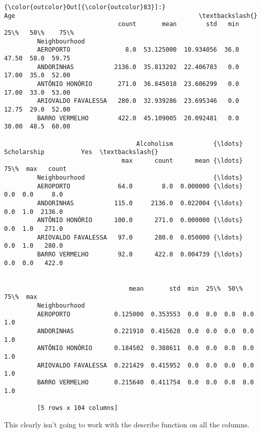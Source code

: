 \documentclass[11pt]{article}
\begin{document}
\begin{Verbatim}[commandchars=\\\{\}]
{\color{outcolor}Out[{\color{outcolor}83}]:}                         Age                                                  \textbackslash{}
                               count       mean        std   min    25\%   50\%    75\%   
         Neighbourhood                                                                 
         AEROPORTO               8.0  53.125000  10.934056  36.0  47.50  58.0  59.75   
         ANDORINHAS           2136.0  35.813202  22.406783   0.0  17.00  35.0  52.00   
         ANTÔNIO HONÓRIO       271.0  36.845018  23.606299   0.0  17.00  33.0  53.00   
         ARIOVALDO FAVALESSA   280.0  32.939286  23.695346   0.0  12.75  29.0  52.00   
         BARRO VERMELHO        422.0  45.109005  20.092481   0.0  30.00  48.5  60.00   
         
                                    Alcoholism           {\ldots}  Scholarship          Yes  \textbackslash{}
                                max      count      mean {\ldots}          75\%  max   count   
         Neighbourhood                                   {\ldots}                             
         AEROPORTO             64.0        8.0  0.000000 {\ldots}          0.0  0.0     8.0   
         ANDORINHAS           115.0     2136.0  0.022004 {\ldots}          0.0  1.0  2136.0   
         ANTÔNIO HONÓRIO      100.0      271.0  0.000000 {\ldots}          0.0  1.0   271.0   
         ARIOVALDO FAVALESSA   97.0      280.0  0.050000 {\ldots}          0.0  1.0   280.0   
         BARRO VERMELHO        92.0      422.0  0.004739 {\ldots}          0.0  0.0   422.0   
         
                                                                           
                                  mean       std  min  25\%  50\%  75\%  max  
         Neighbourhood                                                     
         AEROPORTO            0.125000  0.353553  0.0  0.0  0.0  0.0  1.0  
         ANDORINHAS           0.221910  0.415628  0.0  0.0  0.0  0.0  1.0  
         ANTÔNIO HONÓRIO      0.184502  0.388611  0.0  0.0  0.0  0.0  1.0  
         ARIOVALDO FAVALESSA  0.221429  0.415952  0.0  0.0  0.0  0.0  1.0  
         BARRO VERMELHO       0.215640  0.411754  0.0  0.0  0.0  0.0  1.0  
         
         [5 rows x 104 columns]
\end{Verbatim}
            
    This clearly isn't going to work with the describe function on all the
columns.
\end{document}
